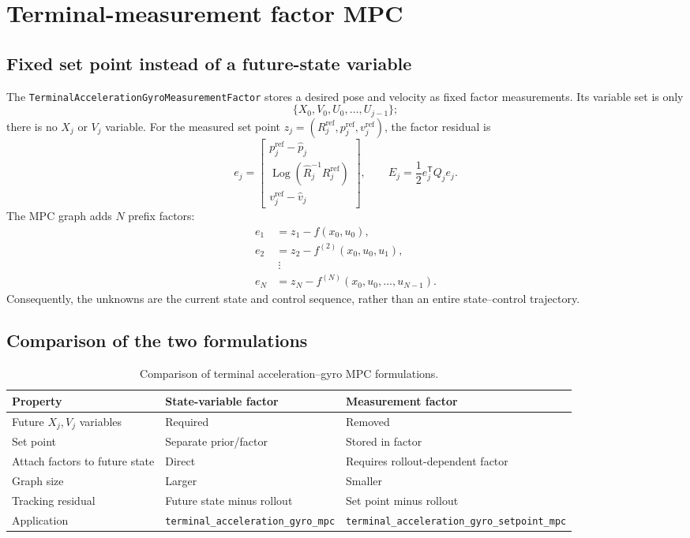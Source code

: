 \documentclass[11pt]{article}
\newcommand{\Log}{\operatorname{Log}}
\newcommand{\transpose}{\mathsf{T}}
\begin{document}
\section{Terminal-measurement factor MPC}

\subsection{Fixed set point instead of a future-state variable}

The \texttt{TerminalAccelerationGyroMeasurementFactor} stores a desired pose and velocity as fixed
factor measurements.  Its variable set is only
\begin{equation}
\{X_0,V_0,U_0,\ldots,U_{j-1}\};
\end{equation}
there is no $X_j$ or $V_j$ variable.  For the measured set point
$z_j=(R_j^{\mathrm{ref}},p_j^{\mathrm{ref}},v_j^{\mathrm{ref}})$, the factor residual is
\begin{equation}
e_j=
\begin{bmatrix}
p_j^{\mathrm{ref}}-\widehat p_j\\
\Log(\widehat R_j^{-1}R_j^{\mathrm{ref}})\\
v_j^{\mathrm{ref}}-\widehat v_j
\end{bmatrix},
\qquad
E_j=\frac{1}{2}e_j^\transpose Q_j e_j.
\label{eq:measurement-residual}
\end{equation}
The MPC graph adds $N$ prefix factors:
\begin{align}
e_1 &= z_1-f(x_0,u_0),\nonumber\\
e_2 &= z_2-f^{(2)}(x_0,u_0,u_1),\nonumber\\
&\ \vdots\nonumber\\
e_N &= z_N-f^{(N)}(x_0,u_0,\ldots,u_{N-1}).
\end{align}
Consequently, the unknowns are the current state and control sequence, rather than an entire
state--control trajectory.

\subsection{Comparison of the two formulations}

\begin{table}[h]
\centering
\begin{tabular}{@{}lll@{}}
\toprule
Property & State-variable factor & Measurement factor \\
\midrule
Future $X_j,V_j$ variables & Required & Removed \\
Set point & Separate prior/factor & Stored in factor \\
Attach factors to future state & Direct & Requires rollout-dependent factor \\
Graph size & Larger & Smaller \\
Tracking residual & Future state minus rollout & Set point minus rollout \\
Application & \texttt{terminal\_acceleration\_gyro\_mpc} &
\texttt{terminal\_acceleration\_gyro\_setpoint\_mpc} \\
\bottomrule
\end{tabular}
\caption{Comparison of terminal acceleration--gyro MPC formulations.}
\end{table}
\end{document}
